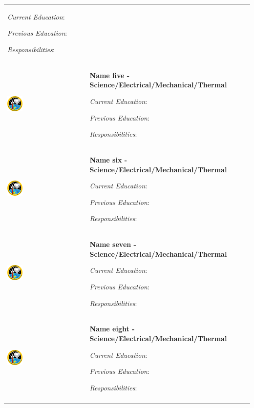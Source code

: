 \begin{longtable}[]{m{} m{}}
\smallskip
\textit{Current Education}: 

\smallskip
\textit{Previous Education}:

\smallskip
\textit{Responsibilities}:                           
\bigskip
\\
 \includegraphics[width=0.2\textwidth]{0-cover/img/logo-rexus-bexus.png}  & \textbf{Name five - Science/Electrical/Mechanical/Thermal}

\smallskip
\textit{Current Education}: 

\smallskip
\textit{Previous Education}:

\smallskip
\textit{Responsibilities}:                           
\bigskip
\\
 \includegraphics[width=0.2\textwidth]{0-cover/img/logo-rexus-bexus.png}  & \textbf{Name six - Science/Electrical/Mechanical/Thermal}

\smallskip
\textit{Current Education}: 

\smallskip
\textit{Previous Education}:

\smallskip
\textit{Responsibilities}:                           
\bigskip
\\
 \includegraphics[width=0.2\textwidth]{0-cover/img/logo-rexus-bexus.png}  & \textbf{Name seven - Science/Electrical/Mechanical/Thermal}

\smallskip
\textit{Current Education}: 

\smallskip
\textit{Previous Education}:

\smallskip
\textit{Responsibilities}:                           
\bigskip
\\
 \includegraphics[width=0.2\textwidth]{0-cover/img/logo-rexus-bexus.png}  & \textbf{Name eight - Science/Electrical/Mechanical/Thermal}

\smallskip
\textit{Current Education}: 

\smallskip
\textit{Previous Education}:

\smallskip
\textit{Responsibilities}:                           
\bigskip
\\
\label{tab:people}
\end{longtable}
\raggedbottom